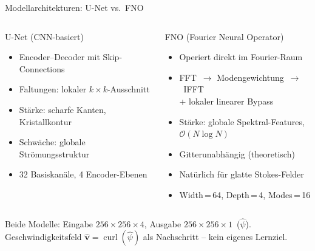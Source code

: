 \documentclass[aspectratio=169]{beamer}
\begin{document}
\begin{frame}{Modellarchitekturen: U-Net vs.\ FNO}
  \begin{columns}[T]
      \begin{block}{U-Net (CNN-basiert)}
        \begin{itemize}
          \item Encoder--Decoder mit Skip-Connections
          \item Faltungen: lokaler $k\times k$-Ausschnitt
          \item \textcolor{bestgreen}{Stärke:} scharfe Kanten,\\
                Kristallkontur
          \item \textcolor{warnred}{Schwäche:} globale\\
                Strömungsstruktur
          \item 32 Basiskanäle, 4 Encoder-Ebenen
        \end{itemize}
      \end{block}

      \begin{block}{FNO (Fourier Neural Operator)}
        \begin{itemize}
          \item Operiert direkt im Fourier-Raum
          \item FFT~$\to$ Modengewichtung~$\to$~IFFT\\
                + lokaler linearer Bypass
          \item \textcolor{bestgreen}{Stärke:} globale Spektral-Features,\\
                $\mathcal{O}(N\log N)$
          \item Gitterunabhängig (theoretisch)
          \item Natürlich für glatte Stokes-Felder
          \item Width\,=\,64, Depth\,=\,4, Modes\,=\,16
        \end{itemize}
      \end{block}
  \end{columns}

  \vspace{10pt}
  \begin{center}
    Beide Modelle: Eingabe $256\times256\times4$, Ausgabe $256\times256\times1$~($\hat\psi$).\\
    \small Geschwindigkeitsfeld $\hat{\mathbf{v}} = \operatorname{curl}(\hat\psi)$ als Nachschritt -- kein eigenes Lernziel.
  \end{center}
\end{frame}
\end{document}

